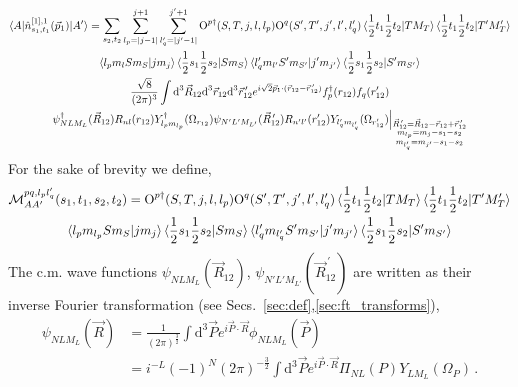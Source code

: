 \documentclass[10pt]{article}
\begin{document}
\begin{multline*}
	\braket{ A | \hat{n}_{s_1,t_1}^{[1],1}(\vec{p}_1) | A'} =  
\sum_{s_2,t_2} \sum_{l_p = |j-1|}^{j+1} \sum_{l_q' = |j' - 1|}^{j'+1} 
\text{O}^{p\dagger}(S,T,j,l,l_p) \text{O}^{q}(S',T',j',l',l_q') \braket{ 
\frac{1}{2} t_1 \frac{1}{2} t_2 | T M_T } \braket{ \frac{1}{2} t_1 \frac{1}{2} 
t_2 | T' M_T'} \\
	\braket{ l_p  m_{l} S m_S | j m_j } \braket{   \frac{1}{2} s_1 
\frac{1}{2} s_2 | S m_S} 
	\braket{ l_q' m_{l'} S' m_{S'} | j' m_{j'} } \braket{   \frac{1}{2} s_1 
\frac{1}{2} s_2 | S' m_{S'}} \\
 \frac{\sqrt{8}}{(2 \pi)^{3}} \int \text{d}^{3} \vec{R}_{12} \text{d}^{3} 
\vec{r}_{12} \text{d}^{3} \vec{r}_{12}^{\, \prime}  e^{ i \sqrt{2} \vec{p}_{1} 
\cdot ( \vec{r}_{12} - \vec{r}_{12}^{\, \prime}) } f_{p}^{\dagger}(r_{12}) 
f_{q}(r_{12}') \\
   \psi_{N L M_L}^{\dagger}(\vec{R}_{12}) R_{nl}(r_{12}) 
Y^\dagger_{l_pm_{l_p}}(\Omega_{r_{12}}) \psi_{N' L' M_{L'}}(\vec{R}_{12}^{\, 
\prime}) 
R_{n'l'}(r'_{12}) Y_{l'_qm_{l'_q}}(\Omega_{r'_{12}}) 
 \Big|_{ \substack{ \vec{R}_{12}^{\, \prime} = 
\vec{R}_{12} - \vec{r}_{12}  + \vec{r}_{12}^{\, \prime} \\ m_{l_p} = m_j - s_1 
- 
s_2 \\ m_{l'_q} = m_{j'} - s_1 - s_2 }}
\end{multline*}
For the sake of brevity we define,
\begin{multline}
 \mathcal{M}_{AA'}^{p q,l_p l_q'}(s_1,t_1,s_2,t_2) = 
\text{O}^{p\dagger}(S,T,j,l,l_p) \text{O}^{q}(S',T',j',l',l_q') \braket{ 
\frac{1}{2} t_1 \frac{1}{2} t_2 | T M_T } \braket{ \frac{1}{2} t_1 \frac{1}{2} 
t_2 | T' M_T'} \\
	\braket{ l_p  m_{l_p} S m_S | j m_j } \braket{   \frac{1}{2} s_1 
\frac{1}{2} s_2 | S m_S} 
	\braket{ l_q' m_{l'_q} S' m_{S'} | j' m_{j'} } \braket{   \frac{1}{2} 
s_1 
\frac{1}{2} s_2 | S' m_{S'}} 
\label{eq:def_M}
\end{multline}
The c.m. wave functions $\psi_{N L M_L}(\vec{R}_{12})$, $\psi_{N' L' 
M_{L'}}(\vec{R}^{\, \prime}_{12})$ are written as their inverse Fourier 
transformation (see Secs.~\ref{sec:def},\ref{sec:ft_transforms}),
\begin{align}
	\psi_{N L M_L}(\vec{R}) &= \frac{1}{(2 \pi)^{\frac{3}{2}}} \int 
\text{d}^{3} \vec{P} e^{i \vec{P} \cdot \vec{R}} \phi_{N L M_{L}}(\vec{P}) \\
	&= i^{-L} (-1)^{N} (2 \pi)^{-\frac{3}{2}} \int \text{d}^{3} \vec{P} 
e^{i \vec{P} \cdot \vec{R}}  \Pi_{N L}(P)  Y_{L M_L}(\Omega_P) \, .
\end{align}
\end{document}
